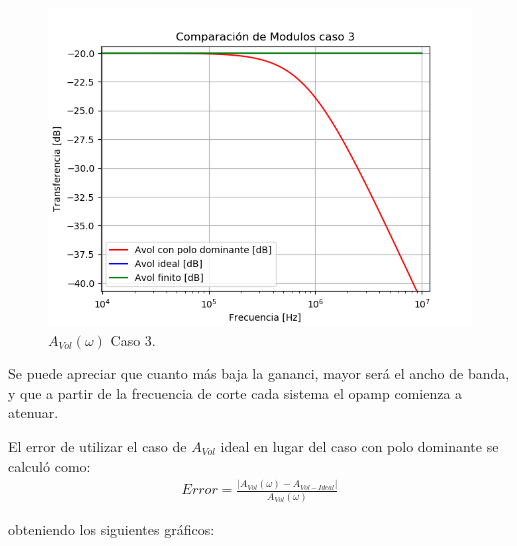 \begin{figure}[H]	
	\centering
	\includegraphics[width=\textwidth]{Ejercicio1/Imagenes/HCompC3.png}
	\caption{$A_{Vol}(\omega)$ Caso 3.}
	\label{fig:AvolC3}
\end{figure}

Se puede apreciar que cuanto más baja la gananci, mayor será el ancho de banda, y que a partir de la frecuencia de corte cada sistema el opamp comienza a atenuar.


El error de utilizar el caso de $A_{Vol}$ ideal en lugar del caso con polo dominante se calculó como:
\begin{align}
	Error = \frac{|A_{Vol}(\omega)-A_{Vol-Ideal}|}{A_{Vol}(\omega)}
\end{align}

obteniendo los siguientes gráficos:

